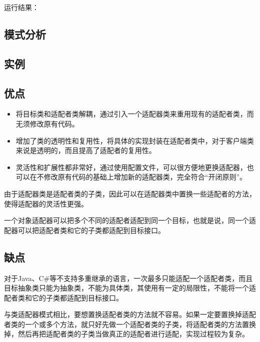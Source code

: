 \documentclass[letterpaper,10pt,english]{sphinxmanual}
\begin{document}
\sphinxAtStartPar
运行结果：

\noindent{}


\subsection{模式分析}
\label{\detokenize{structural_patterns/adapter:id8}}

\subsection{实例}
\label{\detokenize{structural_patterns/adapter:id9}}

\subsection{优点}
\label{\detokenize{structural_patterns/adapter:id10}}\begin{itemize}
\item {} 
\sphinxAtStartPar
将目标类和适配者类解耦，通过引入一个适配器类来重用现有的适配者类，而无须修改原有代码。

\item {} 
\sphinxAtStartPar
增加了类的透明性和复用性，将具体的实现封装在适配者类中，对于客户端类来说是透明的，而且提高了适配者的复用性。

\item {} 
\sphinxAtStartPar
灵活性和扩展性都非常好，通过使用配置文件，可以很方便地更换适配器，也可以在不修改原有代码的基础上增加新的适配器类，完全符合“开闭原则”。

\end{itemize}
\begin{description}
\sphinxAtStartPar
由于适配器类是适配者类的子类，因此可以在适配器类中置换一些适配者的方法，使得适配器的灵活性更强。

\sphinxAtStartPar
一个对象适配器可以把多个不同的适配者适配到同一个目标，也就是说，同一个适配器可以把适配者类和它的子类都适配到目标接口。

\end{description}


\subsection{缺点}
\label{\detokenize{structural_patterns/adapter:id11}}\begin{description}
\sphinxAtStartPar
对于Java、C\#等不支持多重继承的语言，一次最多只能适配一个适配者类，而且目标抽象类只能为抽象类，不能为具体类，其使用有一定的局限性，不能将一个适配者类和它的子类都适配到目标接口。

\sphinxAtStartPar
与类适配器模式相比，要想置换适配者类的方法就不容易。如果一定要置换掉适配者类的一个或多个方法，就只好先做一个适配者类的子类，将适配者类的方法置换掉，然后再把适配者类的子类当做真正的适配者进行适配，实现过程较为复杂。

\end{description}
\end{document}
